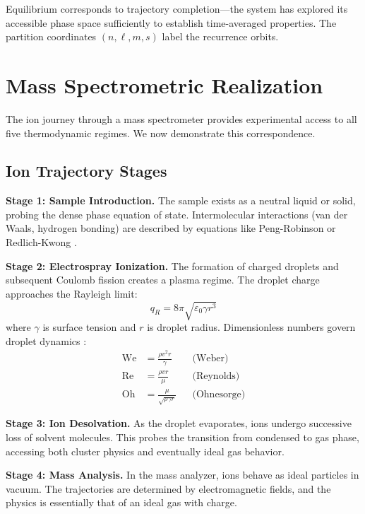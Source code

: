 \documentclass[twocolumn,aps,prd,superscriptaddress,nofootinbib]{revtex4-2}
\newcommand{\We}{\mathrm{We}}
\newcommand{\Rey}{\mathrm{Re}}
\newcommand{\Oh}{\mathrm{Oh}}
\begin{document}
Equilibrium corresponds to trajectory completion---the system has explored its accessible phase space sufficiently to establish time-averaged properties. The partition coordinates $(n, \ell, m, s)$ label the recurrence orbits.

\section{Mass Spectrometric Realization}
\label{sec:ms}

The ion journey through a mass spectrometer \cite{gross2017mass, fenn1989electrospray} provides experimental access to all five thermodynamic regimes. We now demonstrate this correspondence.

\subsection{Ion Trajectory Stages}

\textbf{Stage 1: Sample Introduction.} The sample exists as a neutral liquid or solid, probing the dense phase equation of state. Intermolecular interactions (van der Waals, hydrogen bonding) are described by equations like Peng-Robinson \cite{peng1976new} or Redlich-Kwong \cite{redlich1949algebraic}.

\textbf{Stage 2: Electrospray Ionization.} The formation of charged droplets and subsequent Coulomb fission \cite{dole1968molecular, iribarne1976evaporation, kebarle2009electrospray} creates a plasma regime. The droplet charge approaches the Rayleigh limit:
\begin{equation}
q_R = 8\pi\sqrt{\varepsilon_0 \gamma r^3}
\end{equation}
where $\gamma$ is surface tension and $r$ is droplet radius. Dimensionless numbers govern droplet dynamics \cite{white2011fluid, ohnesorge1936formation, clift1978bubbles}:
\begin{align}
\We &= \frac{\rho v^2 r}{\gamma} & &\text{(Weber)} \\
\Rey &= \frac{\rho v r}{\mu} & &\text{(Reynolds)} \\
\Oh &= \frac{\mu}{\sqrt{\rho \gamma r}} & &\text{(Ohnesorge)}
\end{align}

\textbf{Stage 3: Ion Desolvation.} As the droplet evaporates, ions undergo successive loss of solvent molecules. This probes the transition from condensed to gas phase, accessing both cluster physics and eventually ideal gas behavior.

\textbf{Stage 4: Mass Analysis.} In the mass analyzer, ions behave as ideal particles in vacuum. The trajectories are determined by electromagnetic fields, and the physics is essentially that of an ideal gas with charge.
\end{document}
